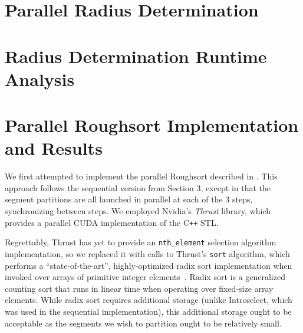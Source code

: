 \documentclass[letterpaper, 12pt]{article}
\let\supercite\cite
\renewcommand{\cite}[1]{\textnormal{~\supercite{#1}}}
\begin{document}
\section{Parallel Radius Determination}

\section{Radius Determination Runtime Analysis}

\begin{sidewaysfigure}

\vspace{-4ex}
\caption{\label{fig:seqpar2}{\em
  Radius Determination Runtimes over Arrays of Length $n\cdot 10^6$, $k = 2$
}}
\end{sidewaysfigure}

\begin{sidewaysfigure}

\vspace{-4ex}
\caption{\label{fig:seqpar100}{\em
  Radius Determination Runtimes over Arrays of Length $n\cdot 10^6$, $k = 100$
}}
\end{sidewaysfigure}

\clearpage
\section{Parallel Roughsort Implementation and Results}

We first attempted to implement the parallel Roughsort described in \supercite{altman89}.
This approach follows the sequential version from Section 3, except in that the segment partitions are all launched in parallel
  at each of the 3 steps, synchronizing between steps.
We employed Nvidia's \textit{Thrust} library, which provides a parallel CUDA implementation of the C\texttt{++} STL.

Regrettably, Thrust has yet to provide an \texttt{nth_element} selection algorithm implementation, so we replaced it with calls
  to Thrust's \texttt{sort} algorithm, which performs a ``state-of-the-art'', highly-optimized radix sort
  implementation when invoked over arrays of primitive integer elements\cite{thrustradix, leischner09}.
Radix sort is a generalized counting sort that runs in linear time when operating over fixed-size array elements.
While radix sort requires additional storage (unlike Introselect, which was used in the sequential implementation), this
  additional storage ought to be acceptable as the segments we wish to partition ought to be relatively small.
\end{document}
